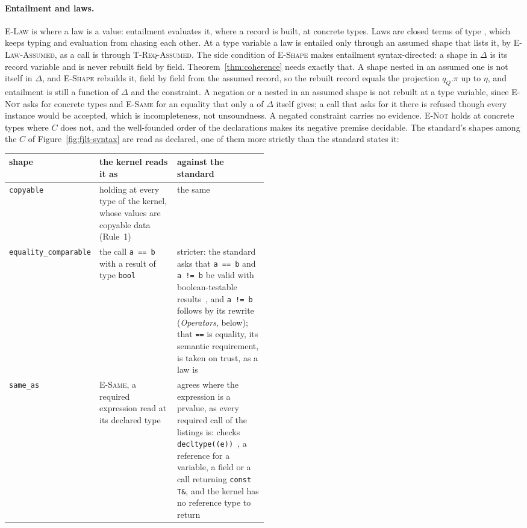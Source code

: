 \paragraph{Entailment and laws.}
\textsc{E-Law} is where a law is a value: entailment evaluates it, where a record is built, at concrete types.
Laws are closed terms of type , which keeps typing and evaluation from chasing each other.
At a type variable a law is entailed only through an assumed shape that lists it, by \textsc{E-Law-Assumed}, as a call is through \textsc{T-Req-Assumed}.
The side condition of \textsc{E-Shape} makes entailment syntax-directed: a shape in $\Delta$ is its record variable and is never rebuilt field by field.
Theorem~\ref{thm:coherence} needs exactly that.
A shape nested in an assumed one is not itself in $\Delta$, and \textsc{E-Shape} rebuilds it, field by field from the assumed record, so the rebuilt record equals the projection $q_Q.\pi$ up to $\eta$, and entailment is still a function of $\Delta$ and the constraint.
A negation or a  nested in an assumed shape is not rebuilt at a type variable, since \textsc{E-Not} asks for concrete types and \textsc{E-Same} for an equality that only a  of $\Delta$ itself gives; a call that asks for it there is refused though every instance would be accepted, which is incompleteness, not unsoundness.
A negated constraint  carries no evidence.
\textsc{E-Not} holds at concrete types where $C$ does not, and the well-founded order of the declarations makes its negative premise decidable.
The standard's shapes among the $C$ of Figure~\ref{fig:fjlt-syntax} are read as declared, one of them more strictly than the standard states it:
\begin{center}
\small
\begin{tabularx}{\linewidth}{@{}>{\raggedright\arraybackslash}p{0.2\linewidth}>{\raggedright\arraybackslash}p{0.3\linewidth}>{\raggedright\arraybackslash}X@{}}
\toprule
shape & the kernel reads it as & against the standard \\
\midrule
\texttt{copyable} & holding at every type of the kernel, whose values are copyable data (Rule~1) & the same \\
\texttt{equality\_comparable} & the call \texttt{a == b} with a result of type \texttt{bool} & stricter: the standard asks that \texttt{a == b} and \texttt{a != b} be valid with boolean-testable results~\cite[{\texttt{concept.equalitycomparable}}]{cpp23standard}, and \texttt{a != b} follows by its rewrite (\emph{Operators}, below); that \texttt{==} is equality, its semantic requirement, is taken on trust, as a law is \\
\texttt{same\_as} & \textsc{E-Same}, a required expression read at its declared type & agrees where the expression is a prvalue, as every required call of the listings is: \Cpp{} checks \texttt{decltype((e))}~\cite[{\texttt{expr.prim.req.compound}}]{cpp23standard}, a reference for a variable, a field or a call returning \texttt{const T\&}, and the kernel has no reference type to return \\
\bottomrule
\end{tabularx}
\end{center}

